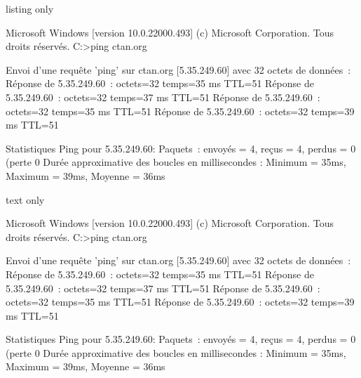 \documentclass[a4paper,french,11pt]{article}
\begin{document}
\begin{PresCodeTexPL}{listing only}
\begin{TerminalWin}[15cm]{} %
Microsoft Windows [version 10.0.22000.493]
(c) Microsoft Corporation. Tous droits réservés.
C:\Users\test>ping ctan.org

Envoi d'une requête 'ping' sur ctan.org [5.35.249.60] avec 32 octets de données :
Réponse de 5.35.249.60 : octets=32 temps=35 ms TTL=51
Réponse de 5.35.249.60 : octets=32 temps=37 ms TTL=51
Réponse de 5.35.249.60 : octets=32 temps=35 ms TTL=51
Réponse de 5.35.249.60 : octets=32 temps=39 ms TTL=51

Statistiques Ping pour 5.35.249.60:
Paquets : envoyés = 4, reçus = 4, perdus = 0 (perte 0%
Durée approximative des boucles en millisecondes :
Minimum = 35ms, Maximum = 39ms, Moyenne = 36ms
\end{TerminalWin}

\end{PresCodeTexPL}

\begin{PresCodeSortiePL}{text only}
\begin{TerminalWin}[15cm]{}
Microsoft Windows [version 10.0.22000.493]
(c) Microsoft Corporation. Tous droits réservés.
C:\Users\test>ping ctan.org

Envoi d'une requête 'ping' sur ctan.org [5.35.249.60] avec 32 octets de données :
Réponse de 5.35.249.60 : octets=32 temps=35 ms TTL=51
Réponse de 5.35.249.60 : octets=32 temps=37 ms TTL=51
Réponse de 5.35.249.60 : octets=32 temps=35 ms TTL=51
Réponse de 5.35.249.60 : octets=32 temps=39 ms TTL=51

Statistiques Ping pour 5.35.249.60:
Paquets : envoyés = 4, reçus = 4, perdus = 0 (perte 0%
Durée approximative des boucles en millisecondes :
Minimum = 35ms, Maximum = 39ms, Moyenne = 36ms
\end{TerminalWin}


\end{PresCodeSortiePL}
\end{document}
